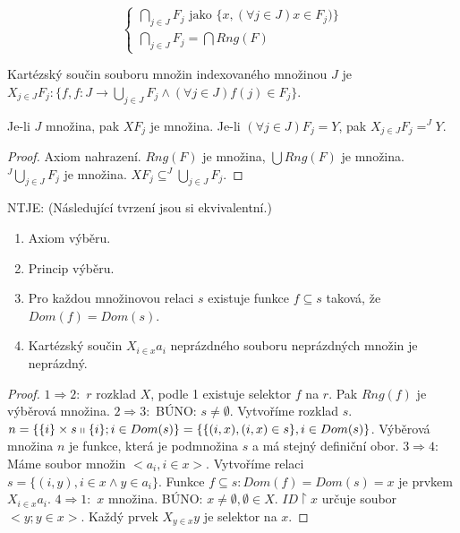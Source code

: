 $$
\left\{
\begin{array}{l}
	\bigcap_{j \in J} F_{j} \text{ jako } \{x, (\forall j \in J) x \in F_{j})\} \\
	\bigcap_{j \in J} F_{j} = \bigcap Rng(F)
\end{array}
\right.
$$

Kartézský součin souboru množin indexovaného množinou $J$ je $X_{j \in J} F_{j} : \{f, f: J \to \bigcup_{j \in J} F_{j} \land (\forall j \in J)f(j) \in F_{j}\}$.

\begin{lemma}
	Je-li $J$ množina, pak $XF_{j}$ je množina. Je-li $(\forall j \in J) F_{j} = Y$, pak $X_{j \in J}F_{j} = ^{J}Y$.
\end{lemma}

\begin{proof}
	Axiom nahrazení. $Rng(F)$ je množina, $\bigcup Rng(F)$ je množina. $^{J}\bigcup_{j\in J}F_{j}$ je množina. $XF_{j} \subseteq ^{J}\bigcup_{j \in J} F_{j}$.
\end{proof}

\begin{lemma}
	NTJE: (Následující tvrzení jsou si ekvivalentní.)
	
	\begin{enumerate}
		\item Axiom výběru.
		\item Princip výběru.
		\item Pro každou množinovou relaci $s$ existuje funkce $f \subseteq s$ taková, že $Dom(f) = Dom(s)$.
		\item Kartézský součin $X_{i \in x} a_{i}$ neprázdného souboru neprázdných množin je neprázdný.
	\end{enumerate}
\end{lemma}

\begin{proof}
	$1 \Rightarrow 2:$ $r$ rozklad $X$, podle 1 existuje selektor $f$ na $r$. Pak $Rng(f)$ je výběrová množina. $2 \Rightarrow 3:$ BÚNO: $s \neq \emptyset$. Vytvoříme rozklad $s$. $n = \{\{i\}\times s \shortparallel\{i\}; i \in Dom(s)\} = \{\{(i,x),(i,x) \in s\}, i \in Dom(s)\}$. Výběrová množina $n$ je funkce, která je podmnožina $s$ a má stejný definiční obor. $3 \Rightarrow 4:$ Máme soubor množin $<a_{i}, i \in x>$. Vytvoříme relaci $s = \{(i,y), i \in x \land y \in a_{i}\}$. Funkce $f \subseteq s: Dom(f) = Dom(s) = x$ je prvkem $X_{i \in x}a_{i}$. $4 \Rightarrow 1:$ $x$ množina. BÚNO: $x \neq \emptyset, \emptyset \in X$. $ID \upharpoonright x$ určuje soubor $<y;y \in x>$. Každý prvek $X_{y \in x}y$ je selektor na $x$.
\end{proof}

